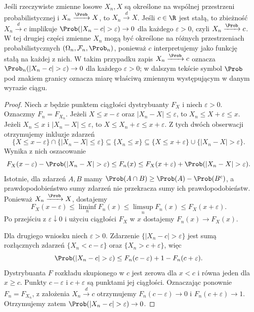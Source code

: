 \begin{twierdzenie}
Jeśli rzeczywiste zmienne losowe $X_n,X$ są określone
na wspólnej przestrzeni probabilistycznej i
$X_n\xrightarrow{\Prob}X$, to $X_n\xrightarrow{d}X$.
Jeśli $c\in\R$ jest stałą, to zbieżność
$X_n\xrightarrow{d}c$ implikuje
$\Prob(|X_n-c|>\varepsilon)\to0$ dla każdego
$\varepsilon>0$, czyli $X_n\xrightarrow{\Prob}c$.
W tej drugiej części zmienne $X_n$ mogą być określone
na różnych przestrzeniach probabilistycznych
$(\Omega_n,\mathcal F_n,\Prob_n)$, ponieważ $c$
interpretujemy jako funkcję stałą na każdej z nich.
W takim przypadku zapis $X_n\xrightarrow{\Prob}c$
oznacza $\Prob_n(|X_n-c|>\varepsilon)\to0$ dla
każdego $\varepsilon>0$; w dalszym tekście symbol
$\Prob$ pod znakiem granicy oznacza miarę właściwą
zmiennym występującym w danym wyrazie ciągu.
\end{twierdzenie}
\begin{proof}
Niech $x$ będzie punktem ciągłości dystrybuanty $F_X$
i niech $\varepsilon>0$. Oznaczmy $F_n=F_{X_n}$.
Jeżeli $X\leq x-\varepsilon$ oraz $|X_n-X|\leq\varepsilon$,
to $X_n\leq X+\varepsilon\leq x$.
Jeżeli $X_n\leq x$ i $|X_n-X|\leq\varepsilon$,
to $X\leq X_n+\varepsilon\leq x+\varepsilon$.
Z tych dwóch obserwacji otrzymujemy inkluzje zdarzeń
\[
\{X\leq x-\varepsilon\}\cap\{|X_n-X|\leq\varepsilon\}
\subseteq\{X_n\leq x\}
\subseteq\{X\leq x+\varepsilon\}\cup
\{|X_n-X|>\varepsilon\}.
\]
Wynika z nich oszacowanie
\[
F_X(x-\varepsilon)-\Prob(|X_n-X|>\varepsilon)
\leq F_n(x)
\leq F_X(x+\varepsilon)+\Prob(|X_n-X|>\varepsilon).
\]
Istotnie, dla zdarzeń $A,B$ mamy
$\Prob(A\cap B)\geq\Prob(A)-\Prob(B^c)$,
a prawdopodobieństwo sumy zdarzeń nie przekracza
sumy ich prawdopodobieństw.
Ponieważ $X_n\xrightarrow{\Prob}X$, dostajemy
\[
F_X(x-\varepsilon)\leq\liminf_nF_n(x)
\leq\limsup_nF_n(x)\leq F_X(x+\varepsilon).
\]
Po przejściu z $\varepsilon\downarrow0$ i użyciu
ciągłości $F_X$ w $x$ dostajemy $F_n(x)\to F_X(x)$.

Dla drugiego wniosku niech $\varepsilon>0$.
Zdarzenie $\{|X_n-c|>\varepsilon\}$ jest sumą
rozłącznych zdarzeń $\{X_n<c-\varepsilon\}$
oraz $\{X_n>c+\varepsilon\}$, więc
\[
\Prob(|X_n-c|>\varepsilon)
\leq F_n(c-\varepsilon)+1-F_n(c+\varepsilon).
\]
Dystrybuanta $F$ rozkładu skupionego w $c$
jest zerowa dla $x<c$ i równa jeden dla $x\geq c$.
Punkty $c-\varepsilon$ i $c+\varepsilon$ są
punktami jej ciągłości. Oznaczając ponownie
$F_n=F_{X_n}$, z założenia $X_n\xrightarrow{d}c$
otrzymujemy $F_n(c-\varepsilon)\to0$ i
$F_n(c+\varepsilon)\to1$. Otrzymujemy zatem
$\Prob(|X_n-c|>\varepsilon)\to0$.
\end{proof}

